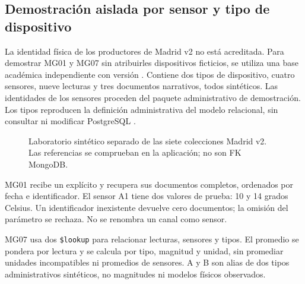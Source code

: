 \subsection{Demostración aislada por sensor y tipo de dispositivo}
La identidad física de los productores de Madrid v2 no está acreditada. Para
demostrar MG01 y MG07 sin atribuirles dispositivos ficticios, se utiliza una base
académica independiente con versión . Contiene dos
tipos de dispositivo, cuatro sensores, nueve lecturas y tres documentos narrativos,
todos sintéticos. Las identidades de los sensores proceden del paquete
administrativo de demostración. Los tipos reproducen la definición administrativa
del modelo relacional, sin consultar ni modificar PostgreSQL \cite{laboratorio}.

\begin{figure}[ht]
\centering
{}
\caption{Laboratorio sintético separado de las siete colecciones Madrid v2.
Las referencias se comprueban en la aplicación; no son FK MongoDB.}
\end{figure}

MG01 recibe un  explícito y recupera sus documentos completos,
ordenados por fecha e identificador. El sensor A1 tiene dos valores de prueba:
10 y 14 grados Celsius. Un identificador inexistente devuelve cero documentos;
la omisión del parámetro se rechaza. No se renombra un canal como sensor.

MG07 usa dos \texttt{\$lookup} para relacionar lecturas, sensores y tipos. El
promedio se pondera por lectura y se calcula por tipo, magnitud y unidad, sin
promediar unidades incompatibles ni promedios de sensores. A y B son alias de dos
tipos administrativos sintéticos, no magnitudes ni modelos físicos observados.

